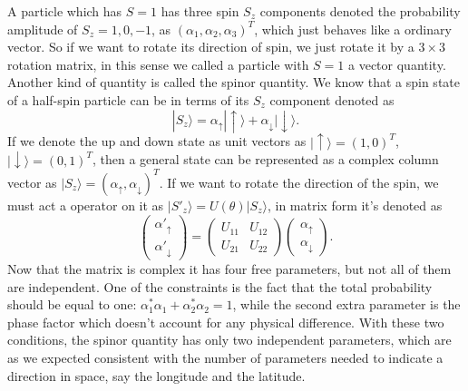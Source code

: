 \documentclass{article}
\newcommand{\be}{\begin{equation}}
\newcommand{\ee}{\end{equation}}
\newcommand{\ba}{\begin{array}}
\newcommand{\ea}{\end{array}}
\renewcommand{\1}{\left}
\renewcommand{\2}{\right}
\newcommand{\ra}{\rangle}
\newcommand{\al}{\alpha}
\renewcommand{\th}{\theta}
\begin{document}
A particle which has $S=1$ has three spin $S_z$ components denoted the probability amplitude of $S_z=1,0,-1$, as $\1( \al_1, \al_2, \al_3\2)^T$, which just behaves like a ordinary vector. So if we want to rotate its direction of spin, we just rotate it by a $3\times3$ rotation matrix, in this sense we called a particle with $S=1$ a vector quantity.\\

Another kind of quantity is called the spinor quantity. We know that a spin state of a half-spin particle can be in terms of its $S_z$ component denoted as
\be |S_z\ra=\al_\uparrow|\uparrow\ra+\al_\downarrow|\downarrow\ra. \ee
If we denote the up and down state as unit vectors as $|\uparrow\ra=(1,0)^T$, $|\downarrow\ra=(0,1)^T$, then a general state can be represented as a complex column vector as $|S_z\ra=(\al_\uparrow,\al_\downarrow)^T$. If we want to rotate the direction of the spin, we must act a operator on it as $|S'_z\ra=U(\th)|S_z\ra$, in matrix form it's denoted as
\be
\1(\ba{c}\al'_\uparrow\\\al'_\downarrow\ea\2)=\1(\ba{cc}U_{11}&U_{12}\\U_{21}&U_{22}\ea\2)\1(\ba{c}\al_\uparrow\\\al_\downarrow\ea\2).
\ee
Now that the matrix is complex  it has four free parameters, but not all of them are independent. One of the constraints is the fact that the total probability should be equal to one: $\al_1^*\al_1+\al_2^*\al_2=1$, while the second extra parameter is the phase factor which doesn't account for any physical difference. With these two conditions, the spinor quantity has only two independent parameters, which are as we expected consistent with the number of parameters needed to indicate a direction in space, say the longitude and the latitude.\\
\end{document}
